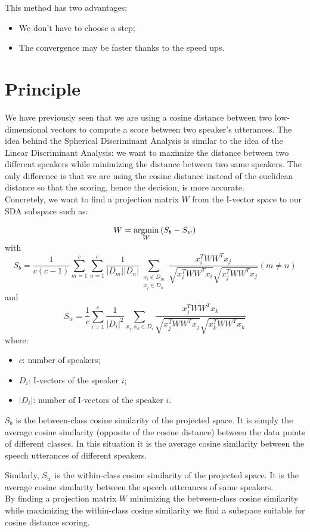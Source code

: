 \documentclass{techrep}
\begin{document}
This method has two advantages:
\begin{itemize}
\item We don't have to choose a step;
\item The convergence may be faster thanks to the speed ups.
\end{itemize}


\section{Principle}

We have previously seen that we are using a cosine distance between
two low-dimensional vectors to compute a score between two speaker's
utterances. The idea behind the Spherical Discriminant Analysis is
similar to the idea of the Linear Discriminant Analysis: we want to
maximize the distance between two different speakers while minimizing
the distance between two same speakers. The only difference is that we
are using the cosine distance instead of the euclidean distance so
that the scoring, hence the decision, is more accurate.\\ Concretely,
we want to find a projection matrix $W$ from the I-vector space to our
SDA subspace such as:

$$W = \smash{\mathop{{\rm argmin}}\limits_{W}}\, (S_b - S_w)$$
with
$$S_b =
\frac{1}{c(c-1)}\sum_{m=1}^c\sum_{n=1}^c\frac{1}{|D_m||D_n|}\sum_{\substack{x_i
    \in D_m \\ x_j \in D_n}}
\frac{x_i^TWW^Tx_j}{\sqrt{x_i^TWW^Tx_i}\sqrt{x_j^TWW^Tx_j}} (m \neq
n)$$ and
$$S_w = \frac{1}{c}\sum_{i=1}^c\frac{1}{|D_i|^2}\sum_{x_j,x_k \in D_i}
\frac{x_j^TWW^Tx_k}{\sqrt{x_j^TWW^Tx_j}\sqrt{x_k^TWW^Tx_k}}$$
where:
\begin{itemize}
  \item $c$: number of speakers;
  \item $D_i$: I-vectors of the speaker $i$;
  \item $|D_i|$: number of I-vectors of the speaker $i$.
\end{itemize}

$S_b$ is the between-class cosine similarity of the projected
space. It is simply the average cosine similarity (opposite of the
cosine distance) between the data points of different classes. In this
situation it is the average cosine similarity between the speech
utterances of different speakers.

Similarly, $S_w$ is the within-class cosine similarity of the
projected space. It is the average cosine similarity between the
speech utterances of same speakers.\\
By finding a projection matrix $W$ minimizing the between-class cosine
similarity while maximizing the within-class cosine similarity we find
a subspace suitable for cosine distance scoring.
\end{document}

